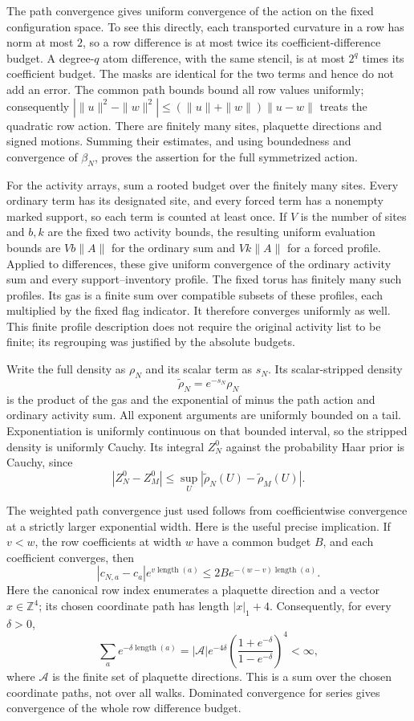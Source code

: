 The path convergence gives uniform convergence of the action on
the fixed configuration space. To see this directly, each transported
curvature in a row has norm at most $2$, so a row difference is
at most twice its coefficient-difference budget. A degree-$q$
atom difference, with the same stencil, is at most $2^q$ times
its coefficient budget. The masks are identical for the two
terms and hence do not add an error. The common path bounds
bound all row values uniformly; consequently
$|\|u\|^2-\|w\|^2|\le(\|u\|+\|w\|)\|u-w\|$
treats the quadratic row action. There are finitely many sites,
plaquette directions and signed motions. Summing their estimates,
and using boundedness and convergence of $\beta_N$, proves the
assertion for the full symmetrized action.

For the activity arrays, sum a rooted budget over the finitely
many sites. Every ordinary term has its designated site, and
every forced term has a nonempty marked support, so each term
is counted at least once. If $V$ is the number of sites and
$b,k$ are the fixed two activity bounds, the resulting uniform
evaluation bounds are $Vb\|A\|$ for the ordinary sum and
$Vk\|A\|$ for a forced profile. Applied to differences, these
give uniform convergence of the ordinary activity sum and every
support--inventory profile. The fixed torus has finitely many
such profiles. Its gas is a finite sum over compatible subsets
of these profiles, each multiplied by the fixed flag indicator.
It therefore converges uniformly as well. This finite profile
description does not require the original activity list to be
finite; its regrouping was justified by the absolute budgets.

Write the full density as $\rho_N$ and its scalar term as $s_N$.
Its scalar-stripped density
\[
                         \widetilde\rho_N=e^{-s_N}\rho_N
\]
is the product of the gas and the exponential of minus the
path action and ordinary activity sum. All exponent arguments
are uniformly bounded on a tail. Exponentiation is uniformly
continuous on that bounded interval, so the stripped density
is uniformly Cauchy. Its integral $Z_N^0$ against the probability
Haar prior is Cauchy, since
\[
       |Z_N^0-Z_M^0|\le\sup_U
                         |\widetilde\rho_N(U)-\widetilde\rho_M(U)|.
\]

The weighted path convergence just used follows from coefficientwise
convergence at a strictly larger exponential width. Here is the
useful precise implication. If $v<w$, the row coefficients at width
$w$ have a common budget $B$, and each coefficient converges, then
\[
 |c_{N,a}-c_a|e^{v\operatorname{length}(a)}
       \le2B e^{-(w-v)\operatorname{length}(a)}.
\]
Here the canonical row index enumerates a plaquette direction and a
vector $x\in\mathbb Z^4$; its chosen coordinate path has length
$|x|_1+4$. Consequently, for every $\delta>0$,
\[
 \sum_a e^{-\delta\operatorname{length}(a)}
 =|\mathcal A|e^{-4\delta}
       \left(\frac{1+e^{-\delta}}{1-e^{-\delta}}\right)^4<\infty,
\]
where $\mathcal A$ is the finite set of plaquette directions.
This is a sum over the chosen coordinate paths, not over all walks.
Dominated convergence for series gives convergence of the whole
row difference budget.

